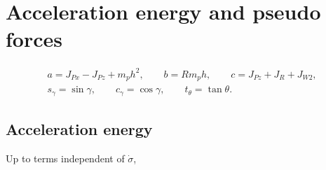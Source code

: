 \section{Acceleration energy and pseudo forces}
\label{sec:appell-energy-forces}

\begin{equation}
\begin{gathered}
a=J_{Px}-J_{Pz}+m_ph^2,\qquad b=Rm_ph,\qquad c=J_{Pz}+J_R+J_{W2},\\
s_\gamma=\sin\gamma,\qquad c_\gamma=\cos\gamma,\qquad t_\theta=\tan\theta.
\end{gathered}
\end{equation}

\subsection*{Acceleration energy}
Up to terms independent of $\dot\sigma$,
